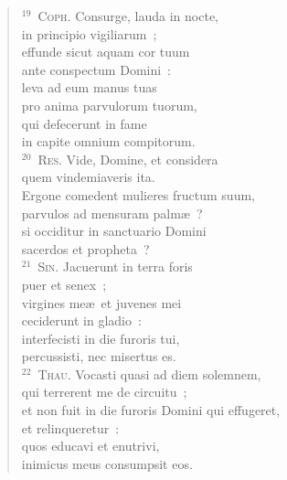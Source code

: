 \begin{flushleft}
\begin{verse}
${}^{19}$~\textsc{Coph.} Consurge, lauda in nocte,\\ in principio vigiliarum~;\\ effunde sicut aquam cor tuum\\ ante conspectum Domini~:\\ leva ad eum manus tuas\\ pro anima parvulorum tuorum,\\ qui defecerunt in fame\\ in capite omnium compitorum.\\
${}^{20}$~\textsc{Res.} Vide, Domine, et considera\\ quem vindemiaveris ita.\\ Ergone comedent mulieres fructum suum,\\ parvulos ad mensuram palm\ae~?\\ si occiditur in sanctuario Domini\\ sacerdos et propheta~?\\
${}^{21}$~\textsc{Sin.} Jacuerunt in terra foris\\ puer et senex~;\\ virgines me\ae\ et juvenes mei\\ ceciderunt in gladio~:\\ interfecisti in die furoris tui,\\ percussisti, nec misertus es.\\
${}^{22}$~\textsc{Thau.} Vocasti quasi ad diem solemnem,\\ qui terrerent me de circuitu~;\\ et non fuit in die furoris Domini qui effugeret,\\ et relinqueretur~:\\ quos educavi et enutrivi,\\ inimicus meus consumpsit eos.\end{verse}\end{flushleft}


